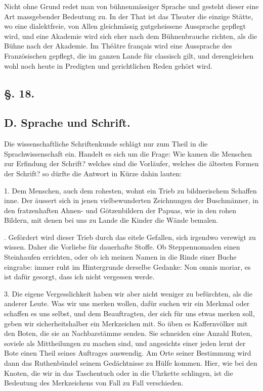 Nicht ohne Grund redet man von bühnenmässiger Sprache und gesteht dieser eine Art massgebender Bedeutung zu. In der That ist das Theater die einzige Stätte, wo eine dialektfreie, von Allen gleichmässig gutgeheissene Aussprache gepflegt wird, und eine Akademie wird sich eher nach dem Bühnenbrauche richten, als die Bühne nach der Akademie. Im Théâtre français wird eine Aussprache des Französischen gepflegt, die im ganzen Lande für classisch gilt, und derengleichen wohl noch heute in Predigten und gerichtlichen Reden gehört wird.

\subsection*{§. 18.}\label{II.VI.18}
\subsection*{D. Sprache und Schrift.}

Die wissenschaftliche Schriftenkunde schlägt nur zum Theil in die Sprachwissenschaft ein. Handelt es sich um die Frage: Wie kamen die Menschen zur Erfindung der Schrift? welches sind die Vorläufer, welches die ältesten Formen der Schrift? so dürfte die Antwort in Kürze dahin lauten:

1. Dem Menschen, auch dem rohesten, wohnt ein Trieb zu bildnerischem Schaffen inne. Der äussert sich in jenen vielbewunderten Zeichnungen der Buschmänner, in den fratzenhaften Ahnen- und Götzenbildern der Papuas, wie in den rohen Bildern, mit denen bei uns zu Lande die Kinder die Wände bemalen.

. Gefördert wird dieser Trieb durch das eitele Gefallen, sich irgendwo verewigt zu wissen. Daher die Vorliebe für dauerhafte Stoffe. Ob Steppennomaden einen Steinhaufen errichten, oder ob ich meinen Namen in die Rinde einer Buche eingrabe: immer ruht im Hintergrunde derselbe Gedanke: Non omnis moriar, es ist dafür gesorgt, dass ich nicht vergessen werde.

3. Die eigene Vergesslichkeit haben wir aber nicht weniger zu befürchten, als die anderer Leute. Was wir uns merken wollen, dafür \label{fp.136} suchen wir ein Merkmal oder schaffen es uns selbst, und dem Beauftragten, der sich für uns etwas merken soll, geben wir sicherheitshalber ein Merkzeichen mit. So üben es Kaffernvölker mit den Boten, die sie an Nachbarstämme senden. Sie schneiden eine Anzahl Ruten, soviele als Mittheilungen zu machen sind, und angesichts einer jeden lernt der Bote einen Theil seines Auftrages auswendig. Am Orte \label{sp.128} seiner Bestimmung wird dann das Ruthenbündel seinem Gedächtnisse zu Hülfe kommen. Hier, wie bei den Knoten, die wir in das Taschentuch oder in die Uhrkette schlingen, ist die Bedeutung des Merkzeichens von Fall zu Fall verschieden.

